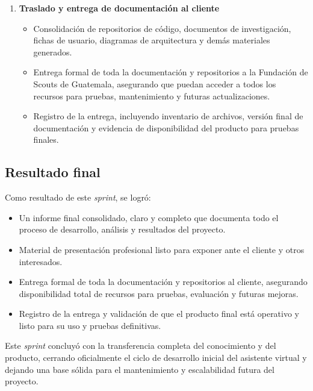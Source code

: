 \begin{enumerate}
      \item \textbf{Traslado y entrega de documentación al cliente}
            \begin{itemize}
                  \item Consolidación de repositorios de código, documentos de investigación, fichas de
                        usuario, diagramas de arquitectura y demás materiales generados.
                  \item Entrega formal de toda la documentación y repositorios a la Fundación de Scouts
                        de Guatemala, asegurando que puedan acceder a todos los recursos para pruebas,
                        mantenimiento y futuras actualizaciones.
                  \item Registro de la entrega, incluyendo inventario de archivos, versión final de
                        documentación y evidencia de disponibilidad del producto para pruebas finales.
            \end{itemize}
\end{enumerate}

\subsection{Resultado final}
Como resultado de este \textit{sprint}, se logró:

\begin{itemize}
      \item Un informe final consolidado, claro y completo que documenta todo el proceso de
            desarrollo, análisis y resultados del proyecto.
      \item Material de presentación profesional listo para exponer ante el cliente y otros
            interesados.
      \item Entrega formal de toda la documentación y repositorios al cliente, asegurando
            disponibilidad total de recursos para pruebas, evaluación y futuras mejoras.
      \item Registro de la entrega y validación de que el producto final está operativo y
            listo para su uso y pruebas definitivas.
\end{itemize}

Este \textit{sprint} concluyó con la transferencia completa del conocimiento y
del producto, cerrando oficialmente el ciclo de desarrollo inicial del
asistente virtual y dejando una base sólida para el mantenimiento y
escalabilidad futura del proyecto.